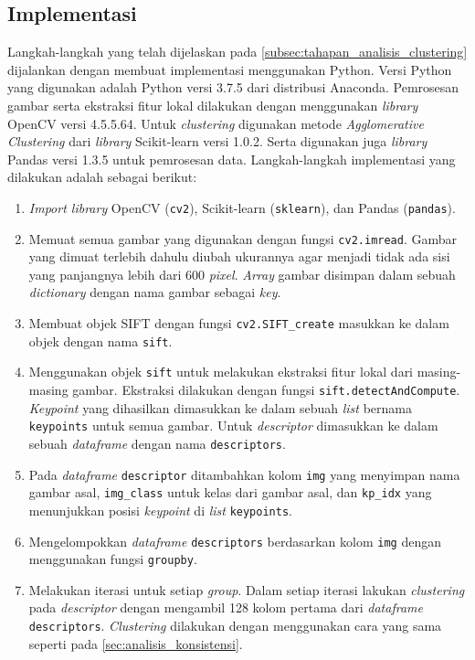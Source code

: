 \subsection{Implementasi}
\label{subsec:tahapan_implementasi_analisis_clustering}
Langkah-langkah yang telah dijelaskan pada \ref{subsec:tahapan_analisis_clustering} dijalankan dengan membuat implementasi menggunakan Python. Versi Python yang digunakan adalah Python versi 3.7.5 dari distribusi Anaconda. Pemrosesan gambar serta ekstraksi fitur lokal dilakukan dengan menggunakan \textit{library} OpenCV versi 4.5.5.64. Untuk \textit{clustering} digunakan metode \textit{Agglomerative Clustering} dari \textit{library} Scikit-learn versi 1.0.2. Serta digunakan juga \textit{library} Pandas versi 1.3.5 untuk pemrosesan data. Langkah-langkah implementasi yang dilakukan adalah sebagai berikut:
\begin{enumerate}
	\item \textit{Import library} OpenCV (\texttt{cv2}), Scikit-learn (\texttt{sklearn}), dan Pandas (\texttt{pandas}).
	\item Memuat semua gambar yang digunakan dengan fungsi \texttt{cv2.imread}. Gambar yang dimuat terlebih dahulu diubah ukurannya agar menjadi tidak ada sisi yang panjangnya lebih dari 600 \textit{pixel}. \textit{Array} gambar disimpan dalam sebuah \textit{dictionary} dengan nama gambar sebagai \textit{key}.
	\item Membuat objek SIFT dengan fungsi \texttt{cv2.SIFT\_create} masukkan ke dalam objek dengan nama \texttt{sift}.
	\item Menggunakan objek \texttt{sift} untuk melakukan ekstraksi fitur lokal dari masing-masing gambar. Ekstraksi dilakukan dengan fungsi \texttt{sift.detectAndCompute}. \textit{Keypoint} yang dihasilkan dimasukkan ke dalam sebuah \textit{list} bernama \texttt{keypoints} untuk semua gambar. Untuk \textit{descriptor} dimasukkan ke dalam sebuah \textit{dataframe} dengan nama \texttt{descriptors}.
	\item Pada \textit{dataframe} \texttt{descriptor} ditambahkan kolom \texttt{img} yang menyimpan nama gambar asal, \texttt{img\_class} untuk kelas dari gambar asal, dan \texttt{kp\_idx} yang menunjukkan posisi \textit{keypoint} di \textit{list} \texttt{keypoints}.
	\item Mengelompokkan \textit{dataframe} \texttt{descriptors} berdasarkan kolom \texttt{img} dengan menggunakan fungsi \texttt{groupby}.
	\item Melakukan iterasi untuk setiap \textit{group}. Dalam setiap iterasi lakukan \textit{clustering} pada \textit{descriptor} dengan mengambil 128 kolom pertama dari \textit{dataframe} \texttt{descriptors}. \textit{Clustering} dilakukan dengan menggunakan cara yang sama seperti pada \ref{sec:analisis_konsistensi}. 

\end{enumerate}
